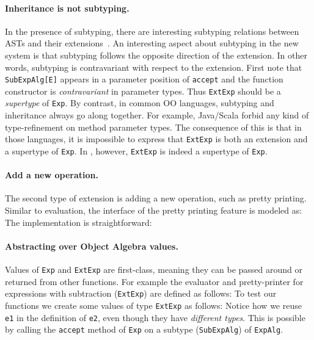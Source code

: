 \paragraph{Inheritance is not subtyping.} In the presence of subtyping, there
are interesting subtyping relations between ASTs and their
extensions~\cite{oliveira09modular}. An interesting aspect about subtyping in
the new system is that subtyping follows the opposite direction of the
extension. In other words, subtyping is contravariant with respect to the
extension. First note that \lstinline{SubExpAlg[E]} appears in a parameter
position of \lstinline{accept} and the function constructor is
\textit{contravariant} in parameter types. Thus \lstinline{ExtExp} should be a
\textit{supertype} of \lstinline{Exp}. By contrast, in common OO languages,
subtyping and inheritance always go along together. For example, Java/Scala
forbid any kind of type-refinement on method parameter types. The consequence of
this is that in those languages, it is impossible to express that
\lstinline{ExtExp} is both an extension and a supertype of
\lstinline{Exp}. In \name, however, \lstinline{ExtExp} is
indeed a supertype of \lstinline{Exp}.

\paragraph{Add a new operation.} The second type of extension is adding a new
operation, such as pretty printing. Similar to evaluation, the interface of the
pretty printing feature is modeled as:
The implementation is straightforward:

\paragraph{Abstracting over Object Algebra values.} Values of \lstinline{Exp} and
\lstinline{ExtExp} are first-class, meaning they can be passed around or
returned from other functions. For example the evaluator and
pretty-printer for expressions with subtraction (\lstinline{ExtExp}) are defined as follows:
To test our functions we create some values of type \lstinline{ExtExp} as follows:
Notice how we reuse \lstinline{e1} in the definition of
\lstinline{e2}, even though they have \emph{different types}. This is
possible by calling the \lstinline{accept}
method of \lstinline{Exp} on a subtype (\lstinline{SubExpAlg})
of \lstinline{ExpAlg}.

